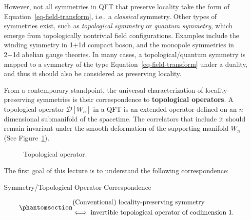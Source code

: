 \documentclass[11pt,toc=bibliography]{scrbook}
\numberwithin{equation}{section}
\begin{document}
However, not all symmetries in QFT that preserve locality take the form
of Equation~\ref{eq-field-transform}, i.e., a \emph{classical} symmetry.
Other types of symmetries exist, such as \emph{topological symmetry} or
\emph{quantum symmetry}, which emerge from topologically nontrivial
field configurations. Examples include the winding symmetry in 1+1d
compact boson, and the monopole symmetries in 2+1d abelian gauge
theories. In many cases, a topological/quantum symmetry is mapped to a
symmetry of the type Equation~\ref{eq-field-transform} under a duality,
and thus it should also be considered as preserving locality.

From a contemporary standpoint, the universal characterization of
locality-preserving symmetries is their correspondence to
\textbf{topological operators}. A topological operator
\(\mathcal{D}[W_n]\) in a QFT is an extended operator defined on an
\(n\)-dimensional submanifold of the spacetime. The correlators that
include it should remain invariant under the smooth deformation of the
supporting manifold \(W_n\) (See Figure~\ref{fig-TopOpsDeform}).

\begin{figure}[t]


\caption{\label{fig-TopOpsDeform}Topological operator.}

\end{figure}%

The first goal of this lecture is to understand the following
correspondence:

\begin{important}{Symmetry/Topological Operator Correspondence}

\begin{equation}\phantomsection\label{eq-conv-STO-corresp}{\begin{split}
&\text{(Conventional) locality-preserving symmetry} \\ 
&\Longleftrightarrow\;
\text{invertible topological operator of codimension 1.}
\end{split}
}\end{equation}

\end{important}
\end{document}
